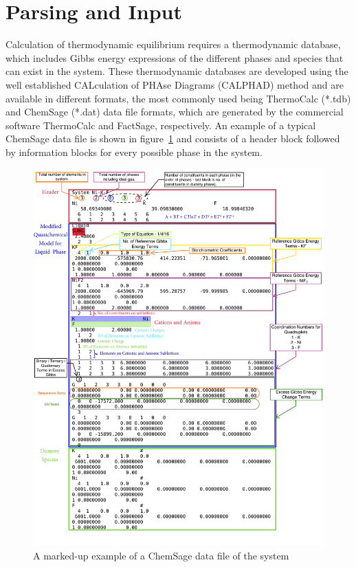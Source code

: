 \section{Parsing and Input}
	Calculation of thermodynamic equilibrium requires a thermodynamic database, which includes Gibbs energy expressions of the different phases and species that can exist in the system. These thermodynamic databases are developed using the well established CALculation of PHAse Diagrams (CALPHAD) method \cite{liu_wang_2016} and are available in different formats, the most commonly used being ThermoCalc (*.tdb) and ChemSage (*.dat) data file formats, which are generated by the commercial software ThermoCalc and FactSage, respectively. An example of a typical ChemSage data file is shown in figure~\ref{fig:datfile} and consists of a header block followed by information blocks for every possible phase in the system. 
	\begin{figure}[htbp]
	 	\centering
	   	\includegraphics[width=\textwidth]{figures/NiKF.pdf} 
	   	\caption{A marked-up example of a ChemSage data file of the  system \cite{OcadizFlores18}}
	   	\label{fig:datfile}
	\end{figure}
	
